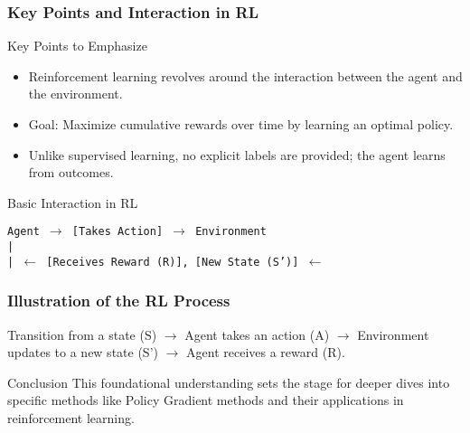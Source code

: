 \documentclass{beamer}
\begin{document}
\begin{frame}[fragile]
    \frametitle{Key Points and Interaction in RL}
    \begin{block}{Key Points to Emphasize}
        \begin{itemize}
            \item Reinforcement learning revolves around the interaction between the agent and the environment.
            \item Goal: Maximize cumulative rewards over time by learning an optimal policy.
            \item Unlike supervised learning, no explicit labels are provided; the agent learns from outcomes.
        \end{itemize}
    \end{block}

    \begin{block}{Basic Interaction in RL}
        \begin{center}
            \texttt{Agent $\rightarrow$ [Takes Action] $\rightarrow$ Environment} \\
            \texttt{|} \\
            \texttt{| $\leftarrow$ [Receives Reward (R)], [New State (S')] $\leftarrow$ } 
        \end{center}
    \end{block}
\end{frame}

\begin{frame}[fragile]
    \frametitle{Illustration of the RL Process}
    \begin{center}
        Transition from a state (S) $\rightarrow$ Agent takes an action (A) $\rightarrow$ Environment updates to a new state (S') $\rightarrow$ Agent receives a reward (R).
    \end{center}
    \begin{block}{Conclusion}
        This foundational understanding sets the stage for deeper dives into specific methods like Policy Gradient methods and their applications in reinforcement learning.
    \end{block}
\end{frame}
\end{document}

